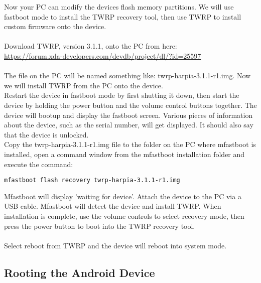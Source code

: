 \noindent Now your PC can modify the devices flash memory partitions.  We will use fastboot mode to install the TWRP recovery tool, then use TWRP to install custom firmware onto the device.\\
\\
Download TWRP, version 3.1.1, onto the PC from here:\\
\url{https://forum.xda-developers.com/devdb/project/dl/?id=25597}\\
\\
The file on the PC will be named something like: twrp-harpia-3.1.1-r1.img.  Now we will install TWRP from the PC onto the device.\\

\noindent Restart the device in fastboot mode by first shutting it down, then start the device by holding the power button and the volume control buttons together.  The device will bootup and display the fastboot screen.  Various pieces of information about the device, such as the serial number, will get displayed.  It should also say that the device is unlocked.\\

\noindent Copy the twrp-harpia-3.1.1-r1.img file to the folder on the PC where mfastboot is installed, open a command window from the mfastboot installation folder and execute the command:
\begin{verbatim}mfastboot flash recovery twrp-harpia-3.1.1-r1.img\end{verbatim}

\noindent Mfastboot will display 'waiting for device'.  Attach the device to the PC via a USB cable.  Mfastboot will detect the device and install TWRP.  When installation is complete, use the volume controls to select recovery mode, then press the power button to boot into the TWRP recovery tool.\\
\\
Select reboot from TWRP and the device will reboot into system mode.
	
\subsection{Rooting the Android Device}
\label{sec:Rooting the Android device}

